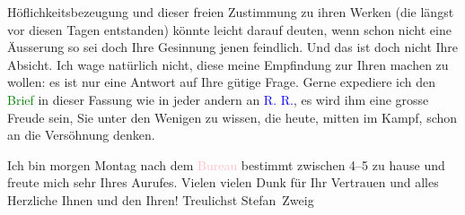                Höflichkeitsbezeugung und dieser freien Zustimmung zu ihren Werken (die längst vor
               diesen Tagen entstanden) könnte leicht darauf deuten, wenn schon nicht eine Äusserung
               so sei doch Ihre Gesinnung jenen feindlich. Und das ist doch nicht Ihre Absicht. Ich
               wage natürlich nicht, diese meine Empfindung zur Ihren machen zu wollen: es ist nur
               eine Antwort auf Ihre gütige Frage. Gerne expediere ich den {\pb}\textcolor{green}{Brief}{}\ledrightnote{{$\rightarrow$}\textcolor{green}{Une protestation d’Arthur Schnitzler}} in dieser Fassung wie in jeder andern an \textcolor{blue}{R. R.}{}\ledrightnote{\textcolor{blue}{Romain Rolland}}, es wird ihm eine grosse Freude sein, Sie
               unter den Wenigen zu wissen, die heute, mitten im Kampf, schon an die Versöhnung
               denken.\pend
           
\pstart
           Ich bin morgen Montag nach dem \textcolor{pink}{Bureau}{}\ledrightnote{{$\rightarrow$}\textcolor{pink}{Österreichisches Kriegsarchiv}} bestimmt zwischen 4–5 zu hause und freute mich sehr Ihres Aurufes.
               Vielen vielen Dunk für Ihr Vertrauen und alles Herzliche Ihnen und den Ihren!
               Treulichst\pend
           \pstart \spacefill\mbox{Stefan Zweig}\pend{}\endnumbering{}
\begin{anhang}
\end{anhang}
      